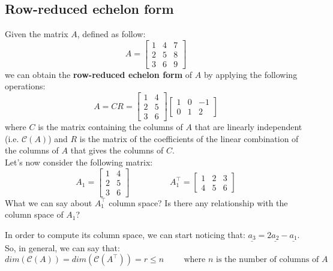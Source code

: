\subsection{Row-reduced echelon form}
Given the matrix $A$, defined as follow:
\[
A = \begin{bmatrix}
    1 & 4 & 7\\
    2 & 5 & 8\\
    3 & 6 & 9
\end{bmatrix}
\]
we can obtain the \textbf{row-reduced echelon form} of $A$ by applying the following operations:
\[
A = CR = \begin{bmatrix}
1 & 4\\
2 & 5\\
3 & 6
\end{bmatrix}
\begin{bmatrix}
    1 & 0 & -1\\
    0 & 1 & 2
\end{bmatrix}
\]
where $C$ is the matrix containing the columns of $A$ that are linearly independent (i.e. $\mathcal{C}(A)$) and $R$ is the matrix of the coefficients of the linear combination of the columns of $A$ that gives the columns of $C$.\\

Let's now consider the following matrix:
\[
A_1 = \begin{bmatrix}
1 & 4\\
2 & 5\\
3 & 6
\end{bmatrix}  
\hspace{2cm}
A_1^\intercal = \begin{bmatrix}
1 & 2 & 3\\
4 & 5 & 6
\end{bmatrix}  
\]
What we can say about $A_1^\intercal$ column space? Is there any relationship with the column space of $A_1$?

In order to compute its column space, we can start noticing that: $\underline{a_3} = 2\underline{a_2} - \underline{a_1}$. So, in general, we can say that:
\[
dim(\mathcal{C}(A)) = dim(\mathcal{C}(A^\intercal)) = r \leq n \hspace{1cm} \text{where $n$ is the number of columns of $A$}
\]

